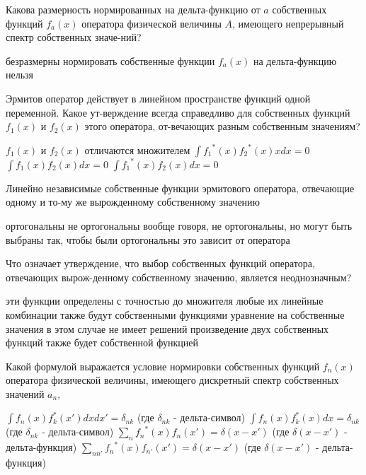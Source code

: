 \documentclass[11pt,a4paper]{exam}
\begin{document}
\begin{questions}
\question Какова размерность нормированных на дельта-функцию от $a$ собственных функций ${f_a}(x)$ оператора физической величины $A$, имеющего непрерывный спектр собственных значе-ний?
\begin{choices}
\choice        
\choice 
\choice безразмерны     
\choice нормировать собственные функции ${f_a}(x)$ на дельта-функцию нельзя
\end{choices}

\question Эрмитов оператор действует в линейном пространстве функций одной переменной. Какое ут-верждение всегда справедливо для собственных функций ${f_1}(x)$ и ${f_2}(x)$ этого оператора, от-вечающих разным собственным значениям?
\begin{choices}
\choice ${f_1}(x)$ и ${f_2}(x)$ отличаются множителем    
\choice $\int {{f_1}^*(x){f_2}^*(x)xdx = } 0$
\choice $\int {{f_1}(x){f_2}(x)dx = } 0$              
\choice $\int {{f_1}^*(x){f_2}(x)dx = } 0$
\end{choices}

\question Линейно независимые собственные функции эрмитового оператора, отвечающие одному и то-му же вырожденному собственному значению
\begin{choices}
\choice ортогональны
\choice не ортогональны
\choice вообще говоря, не ортогональны, но могут быть выбраны так, чтобы были ортогональны
\choice это зависит от оператора
\end{choices}

\question Что означает утверждение, что выбор собственных функций оператора, отвечающих вырож-денному собственному значению, является неоднозначным?
\begin{choices}
\choice эти функции определены с точностью до множителя
\choice любые их линейные комбинации также будут собственными функциями
\choice уравнение на собственные значения в этом случае не имеет решений
\choice произведение двух собственных функций также будет собственной функцией
\end{choices}

\question Какой формулой выражается условие нормировки собственных функций ${f_n}(x)$ оператора физической величины, имеющего дискретный спектр собственных значений ${a_n}$,
\begin{choices}
\choice $\int {{f_n}(x)f_k^*(x')dxdx' = } {\delta _{nk}}$ (где ${\delta _{nk}}$ - дельта-символ)
\choice $\int {{f_n}(x)f_k^*(x)dx = } {\delta _{nk}}$(где ${\delta _{nk}}$ - дельта-символ)
\choice $\sum\limits_n {{f_n}^*(x){f_n}(x')}  = \delta (x - x')$ (где $\delta (x - x')$ - дельта-функция)
\choice $\sum\limits_{nn'} {{f_n}^*(x){f_{n'}}(x')}  = \delta (x - x')$ (где $\delta (x - x')$ - дельта-функция)
\end{choices}


\end{questions}
\end{document}

